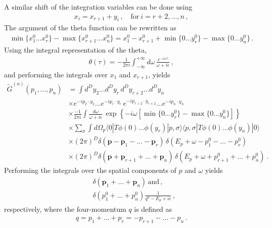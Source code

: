 A similar shift of the integration variables can be done using
\begin{align}
  x_i = x_{r+1} + y_i\, , \quad \mathrm{for}\ i=r+2, \ldots, n\, ,
\end{align}
The argument of the theta function can be rewritten as
\begin{align}
  \min\{x_1^0 \ldots x_r^0\} - \max\{x_{r+1}^0 \ldots x_n^0\} = 
  x_1^0 -x_{r+1}^0 + \min\{0 \ldots y_r^0\} - \max\{0 \ldots y_n^0\}\, .
\end{align}
Using the integral representation of the theta,
\begin{align}
  \theta(\tau) = -\frac{1}{2\pi i} \int_{-\infty}^{+\infty} d\omega\,
  \frac{e^{-i\omega \tau}}{\omega + i\epsilon}\, ,
\end{align}
and performing the integrals over $x_1$ and $x_{r+1}$, yields
\begin{align}
  \tilde{G}^{(n)}(p_1, \ldots, p_n) 
  &= \int d^Dy_2 \ldots d^Dy_r\, d^Dy_{r+2} \ldots d^Dy_n \, \nonumber
  \\
  & \times e^{-ip_2\cdot y_2} \ldots e^{-ip_{r}\cdot y_r} 
    \, e^{-ip_{r+2}\cdot y_{r+2}} \ldots e^{-ip_{n}\cdot y_n}
    \nonumber \\
  & \times \frac{-1}{2\pi i} \int \frac{d\omega}{\omega + i\epsilon}\, 
    \exp\left\{
    -i \omega \left[ 
    \min\{0 \ldots y_r^0\} - \max\{0 \ldots y_n^0\}
    \right]
    \right\} \nonumber \\
  & \times \sum_\sigma \int d\Omega_p
    \langle 0 |  T \phi(0) \ldots \phi(y_r) |
    p,\sigma\rangle \langle p, \sigma | T \phi(0) \ldots \phi(y_n)
    |0\rangle \nonumber \\
  & \times (2\pi)^D \delta(\mathbf{p} - \mathbf{p}_1 - \ldots -
    \mathbf{p}_r) \, 
    \delta(E_p + \omega - p_1^0 - \ldots - p_{r}^0) \nonumber \\
  & \times (2\pi)^D \delta(\mathbf{p} + \mathbf{p}_{r+1} + \ldots +
    \mathbf{p}_n) \, 
    \delta(E_p + \omega + p_{r+1}^0 + \ldots + p_{n}^0) \, .
\end{align}
Performing the integrals over the spatial components of $p$ and
$\omega$ yields
\begin{align}
  &\delta(\mathbf{p}_1+ \ldots +\mathbf{p}_n)\, \mathrm{and}\, , \nonumber \\
  & \delta(p_1^0 + \ldots + p_n^0) \frac{1}{q^0-E_p +i\epsilon}\, ,
\end{align}
respectively, where the four-momentum $q$ is defined as
\begin{align}
  q=p_1 + \ldots + p_r = -p_{r+1} - \ldots - p_n\, .
\end{align}
